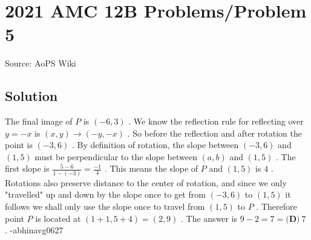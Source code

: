 \documentclass[12pt]{article}
\begin{document}
\section*{{2021 AMC 12B Problems/Problem 5}}
Source: AoPS Wiki

\subsection*{Solution}
The final image of $P$ is $(-6,3)$ . We know the reflection rule for reflecting over $y=-x$ is $(x,y) \rightarrow (-y, -x)$ . So before the reflection and after rotation the point is $(-3,6)$ . By definition of rotation, the slope between $(-3,6)$ and $(1,5)$ must be perpendicular to the slope between $(a,b)$ and $(1,5)$ . The first slope is $\frac{5-6}{1-(-3)} = \frac{-1}{4}$ . This means the slope of $P$ and $(1,5)$ is $4$ . Rotations also preserve distance to the center of rotation, and since we only "travelled" up and down by the slope once to get from $(-3,6)$ to $(1,5)$ it follows we shall only use the slope once to travel from $(1,5)$ to $P$ . Therefore point $P$ is located at $(1+1, 5+4) = (2,9)$ . The answer is $9-2 = 7 = \boxed{\textbf{(D)} ~7}$ . -abhinavg0627
\end{document}
